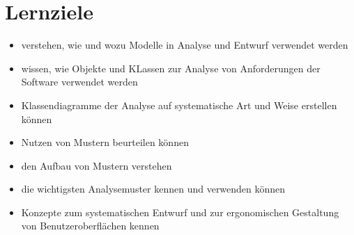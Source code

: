 \section{Lernziele}
\begin{itemize}
    \item verstehen, wie und wozu Modelle in Analyse und Entwurf verwendet werden
    \item wissen, wie Objekte und KLassen zur Analyse von Anforderungen der Software verwendet werden
    \item Klassendiagramme der Analyse auf systematische Art und Weise erstellen können
    \item Nutzen von Mustern beurteilen können
    \item den Aufbau von Mustern verstehen
    \item die wichtigsten Analysemuster kennen und verwenden können
    \item Konzepte zum systematischen Entwurf und zur ergonomischen Gestaltung von Benutzeroberflächen kennen
\end{itemize}